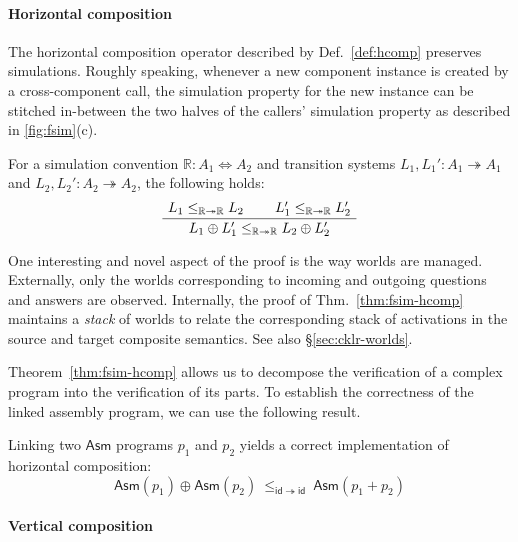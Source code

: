 \documentclass[sigplan,screen,review]{acmart}
\newcommand{\kw}[1]{\ensuremath{ \mathsf{#1} }}
\begin{document}

\paragraph{Horizontal composition} %

The horizontal composition operator
described by Def.~\ref{def:hcomp}
preserves simulations.
Roughly speaking,
whenever a new component instance is created
by a cross-component call,
the simulation property for the new instance
can be stitched in-between
the two halves of the callers' simulation property
as described in \autoref{fig:fsim}(c).

\begin{theorem} \label{thm:fsim-hcomp} %
For a simulation convention
$\mathbb{R} : A_1 \Leftrightarrow A_2$
and transition systems
$L_1, L_1' : A_1 \twoheadrightarrow A_1$ and
$L_2, L_2' : A_2 \twoheadrightarrow A_2$,
the following holds:
\[
    \AxiomC{$L_1 \le_{\mathbb{R} \twoheadrightarrow \mathbb{R}} L_2$}
    \AxiomC{$L_1' \le_{\mathbb{R} \twoheadrightarrow \mathbb{R}} L_2'$}
    \BinaryInfC{$L_1 \oplus L_1'
      \le_{\mathbb{R} \twoheadrightarrow \mathbb{R}}
      L_2 \oplus L_2'$}
    \DisplayProof
\]
\end{theorem}

One interesting and novel aspect of the proof
is the way worlds are managed.
Externally,
only the worlds corresponding to incoming and outgoing
questions and answers are observed.
Internally,
the proof of Thm.~\ref{thm:fsim-hcomp}
maintains a \emph{stack} of
worlds
to relate the corresponding stack of activations
in the source and target composite semantics.
See also \S\ref{sec:cklr-worlds}.

Theorem~\ref{thm:fsim-hcomp}
allows us to decompose the verification of a complex program
into the verification of its parts.
To establish the correctness of the linked assembly program,
we can use the following result.

\begin{theorem} \label{thm:asmlinking} %
Linking two \kw{Asm} programs $p_1$ and $p_2$
yields a correct implementation of
horizontal composition:
\[
      \kw{Asm}(p_1) \oplus \kw{Asm}(p_2)
      \:\le_{\kw{id} \twoheadrightarrow \kw{id}}\:
      \kw{Asm}(p_1 + p_2)
\]
\end{theorem}


\paragraph{Vertical composition} %
\end{document}

